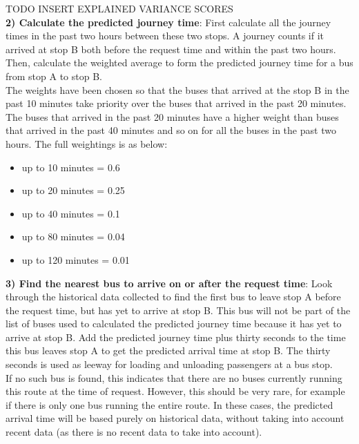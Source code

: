 TODO INSERT EXPLAINED VARIANCE SCORES \\

\textbf{2) Calculate the predicted journey time}: First calculate all the journey times in the past two hours between these two stops. A journey counts if it arrived at stop B both before the request time and within the past two hours. Then, calculate the weighted average to form the predicted journey time for a bus from stop A to stop B. \\

The weights have been chosen so that the buses that arrived at the stop B in the past 10 minutes take priority over the buses that arrived in the past 20 minutes. The buses that arrived in the past 20 minutes have a higher weight than buses that arrived in the past 40 minutes and so on for all the buses in the past two hours. The full weightings is as below:

\begin{multicols}{2}
\begin{itemize}
    \item up to 10 minutes = 0.6
    \item up to 20 minutes = 0.25
    \item up to 40 minutes = 0.1
    \item up to 80 minutes = 0.04
    \item up to 120 minutes = 0.01
\end{itemize}
\end{multicols}

\textbf{3) Find the nearest bus to arrive on or after the request time}: Look through the historical data collected to find the first bus to leave stop A before the request time, but has yet to arrive at stop B. This bus will not be part of the list of buses used to calculated the predicted journey time because it has yet to arrive at stop B. Add the predicted journey time plus thirty seconds to the time this bus leaves stop A to get the predicted arrival time at stop B. The thirty seconds is used as leeway for loading and unloading passengers at a bus stop. \\

If no such bus is found, this indicates that there are no buses currently running this route at the time of request. However, this should be very rare, for example if there is only one bus running the entire route. In these cases, the predicted arrival time will be based purely on historical data, without taking into account recent data (as there is no recent data to take into account). 

